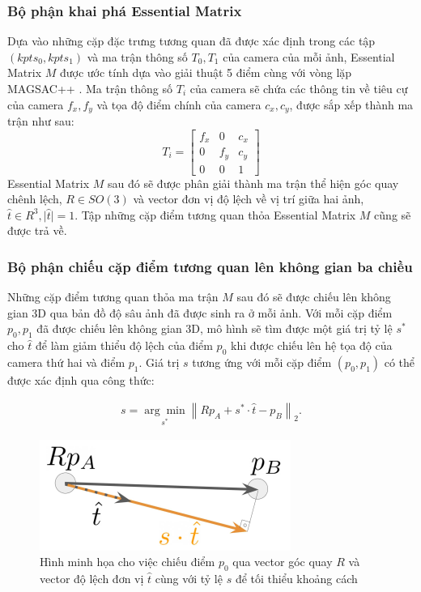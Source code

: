 \subsubsection{Bộ phận khai phá Essential Matrix}

Dựa vào những cặp đặc trưng tương quan đã được xác định trong các tập $(kpts_0, kpts_1)$ và ma trận thông số $T_0, T_1$ của camera của mỗi ảnh, Essential Matrix $M$ được ước tính dựa vào giải thuật 5 điểm \cite{nister2004efficient} cùng với vòng lặp MAGSAC++ \cite{barath2020magsac++}. Ma trận thông số $T_i$ của camera sẽ chứa các thông tin về tiêu cự của camera $f_x,f_y$ và tọa độ điểm chính của camera $c_x,c_y$, được sắp xếp thành ma trận như sau:
\begin{equation}
  T_i = \begin{bmatrix} f_x & 0 & c_x \\ 0 & f_y & c_y \\ 0 & 0 & 1 \end{bmatrix}
\end{equation}
Essential Matrix $M$ sau đó sẽ được phân giải thành ma trận thể hiện góc quay chênh lệch, $R \in SO(3)$ và vector đơn vị độ lệch về vị trí giữa hai ảnh, $\hat{t} \in R^{3}, \lvert \hat{t} \rvert = 1$. Tập những cặp điểm tương quan thỏa Essential Matrix $M$ cũng sẽ được trả về.

\subsubsection{Bộ phận chiếu cặp điểm tương quan lên không gian ba chiều}

Những cặp điểm tương quan thỏa ma trận $M$ sau đó sẽ được chiếu lên không gian 3D qua bản đồ độ sâu ảnh đã được sinh ra ở mỗi ảnh. Với mỗi cặp điểm $p_0, p_1$ đã được chiếu lên không gian 3D, mô hình sẽ tìm được một giá trị tỷ lệ $s^*$ cho $\hat{t}$ để làm giảm thiểu độ lệch của điểm $p_0$ khi được chiếu lên hệ tọa độ của camera thứ hai và điểm $p_1$. Giá trị $s$ tương ứng với mỗi cặp điểm $(p_0, p_1)$ có thể được xác định qua công thức:

\begin{equation}
  \begin{aligned}
    s=\underset{s^*}{\arg \min }\left\|R p_A+s^* \cdot \hat{t}-p_B\right\|_2 .
  \end{aligned}
\end{equation}

\begin{figure}[H]
  \centering
  \includegraphics[scale=1]{pics/Proposal/reprojection.png}
  \caption[Minh họa cho việc xác định tỷ lệ $s$ bằng độ sâu ảnh]{Hình minh họa cho việc chiếu điểm $p_0$ qua vector góc quay $R$ và vector độ lệch đơn vị $\hat{t}$ cùng với tỷ lệ $s$ để tối thiểu khoảng cách \cite{arnold2022mapfree}}
\end{figure}

